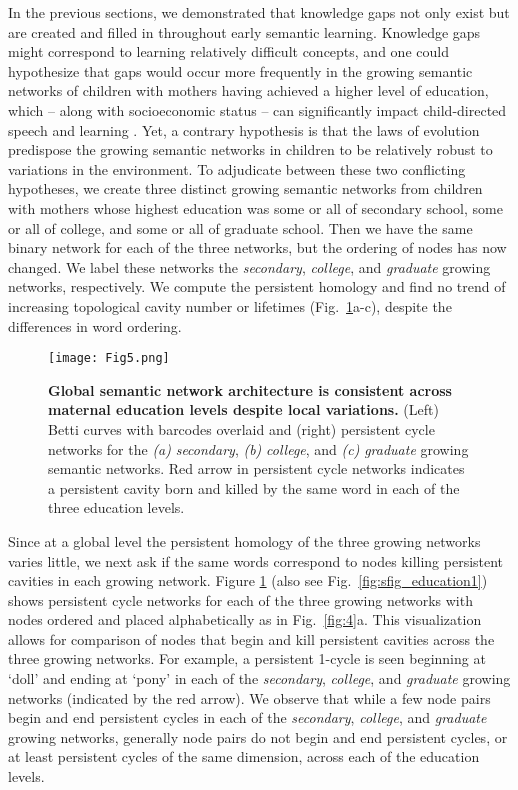 \documentclass{article}
\begin{document}
In the previous sections, we demonstrated that knowledge gaps not only exist but are created and filled in throughout early semantic learning. Knowledge gaps might correspond to learning relatively difficult concepts, and one could hypothesize that gaps would occur more frequently in the growing semantic networks of children with mothers having achieved a higher level of education, which -- along with socioeconomic status \cite{hoff2005socioeconomic,schwab2016language} -- can significantly impact child-directed speech and learning \cite{dollaghan1999maternal}. Yet, a contrary hypothesis is that the laws of evolution predispose the growing semantic networks in children to be relatively robust to variations in the environment. To adjudicate between these two conflicting hypotheses, we create three distinct growing semantic networks from children with mothers whose highest education was some or all of secondary school, some or all of college, and some or all of graduate school. Then we have the same binary network for each of the three networks, but the ordering of nodes has now changed. We label these networks the \textit{secondary}, \textit{college}, and \textit{graduate} growing networks, respectively. We compute the persistent homology and find no trend of increasing topological cavity number or lifetimes (Fig.~\ref{fig:5}a-c), despite the differences in word ordering.


\begin{figure}[t]
	\centering
	\vspace{-10pt}
	\texttt{[image: Fig5.png]}
	\caption{\textbf{Global semantic network architecture is consistent across maternal education levels despite local variations.} (Left) Betti curves with barcodes overlaid and (right) persistent cycle networks for the \emph{(a)} \textit{secondary}, \emph{(b)} \textit{college}, and \emph{(c)} \textit{graduate} growing semantic networks. Red arrow in persistent cycle networks indicates a persistent cavity born and killed by the same word in each of the three education levels.}
	\label{fig:5}
	\vspace{-10pt}
	
\end{figure}


Since at a global level the persistent homology of the three growing networks varies little, we next ask if the same words correspond to nodes killing persistent cavities in each growing network. Figure \ref{fig:5} (also see Fig.~\ref{fig:sfig_education1}) shows persistent cycle networks for each of the three growing networks with nodes ordered and placed alphabetically as in Fig.~\ref{fig:4}a. This visualization allows for comparison of nodes that begin and kill persistent cavities across the three growing networks. For example, a persistent 1-cycle is seen beginning at `doll' and ending at `pony' in each of the \textit{secondary}, \textit{college}, and \textit{graduate} growing networks (indicated by the red arrow). We observe that while a few node pairs begin and end persistent cycles in each of the \textit{secondary}, \textit{college}, and \textit{graduate} growing networks, generally node pairs do not begin and end persistent cycles, or at least persistent cycles of the same dimension, across each of the education levels.
\end{document}
